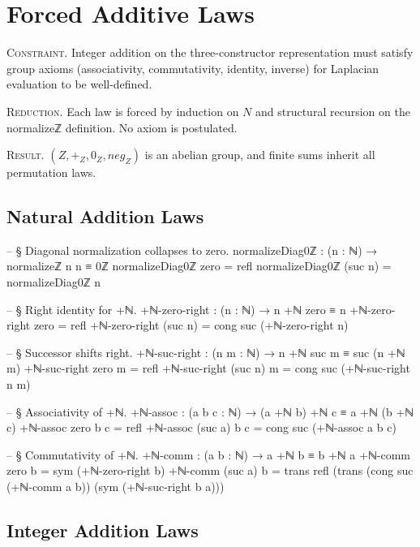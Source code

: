\documentclass[11pt,a4paper]{book}
\def\mathrm#1{#1}%
\def\mathbb#1{#1}%
\def\texttt#1{#1}%
\begin{document}
\chapter{Forced Additive Laws}

\textsc{Constraint.}
Integer addition on the three-constructor representation must satisfy group axioms
(associativity, commutativity, identity, inverse) for Laplacian evaluation to be well-defined.

\textsc{Reduction.}
Each law is forced by induction on $\mathbb{N}$ and structural recursion on the
\texttt{normalizeℤ} definition. No axiom is postulated.

\textsc{Result.}
$(\mathbb{Z}, +_{\mathbb{Z}}, 0_{\mathbb{Z}}, \mathrm{neg}_{\mathbb{Z}})$ is an abelian group,
and finite sums inherit all permutation laws.

\section{Natural Addition Laws}

\begin{code}
-- § Diagonal normalization collapses to zero.
normalizeDiag0ℤ : (n : ℕ) → normalizeℤ n n ≡ 0ℤ
normalizeDiag0ℤ zero = refl
normalizeDiag0ℤ (suc n) = normalizeDiag0ℤ n

-- § Right identity for +ℕ.
+ℕ-zero-right : (n : ℕ) → n +ℕ zero ≡ n
+ℕ-zero-right zero = refl
+ℕ-zero-right (suc n) = cong suc (+ℕ-zero-right n)

-- § Successor shifts right.
+ℕ-suc-right : (n m : ℕ) → n +ℕ suc m ≡ suc (n +ℕ m)
+ℕ-suc-right zero m = refl
+ℕ-suc-right (suc n) m = cong suc (+ℕ-suc-right n m)

-- § Associativity of +ℕ.
+ℕ-assoc : (a b c : ℕ) → (a +ℕ b) +ℕ c ≡ a +ℕ (b +ℕ c)
+ℕ-assoc zero b c = refl
+ℕ-assoc (suc a) b c = cong suc (+ℕ-assoc a b c)

-- § Commutativity of +ℕ.
+ℕ-comm : (a b : ℕ) → a +ℕ b ≡ b +ℕ a
+ℕ-comm zero b = sym (+ℕ-zero-right b)
+ℕ-comm (suc a) b =
  trans
    refl
    (trans
      (cong suc (+ℕ-comm a b))
      (sym (+ℕ-suc-right b a)))
\end{code}

\section{Integer Addition Laws}
\end{document}
